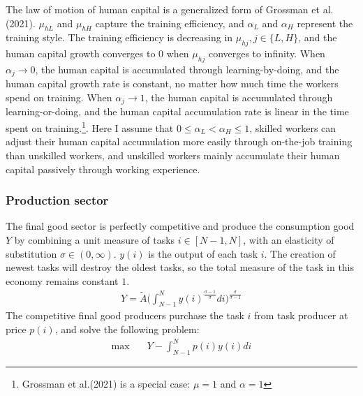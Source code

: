 \documentclass[12pt]{article}
\begin{document}
The law of motion of human capital is a generalized form of Grossman et al.(2021)\cite{Grossmanetal2021}. $\mu_{hL}$ and $\mu_{hH}$ capture the training efficiency, and $\alpha_L$ and $\alpha_H$ represent the training style. The training efficiency is decreasing in $\mu_{hj}, j\in\{L,H\}$, and the human capital growth converges to 0 when $\mu_{hj}$ converges to infinity. When $\alpha_j \to 0$, the human capital is accumulated through learning-by-doing, and the human capital growth rate is constant, no matter how much time the workers spend on training. When $\alpha_j \to 1$, the human capital is accumulated through learning-or-doing, and the human capital accumulation rate is linear in the time spent on training.\footnote{Grossman et al.(2021) is a special case: $\mu = 1$ and $\alpha=1$}. Here I assume that $0\leq\alpha_L<\alpha_H\leq1$, skilled workers can adjust their human capital accumulation more easily through on-the-job training than unskilled workers, and unskilled workers mainly accumulate their human capital passively through working experience. 

\subsubsection*{Production sector}

The final good sector is perfectly competitive and produce the consumption good $Y$ by combining a unit measure of tasks $i\in [N-1,N]$, with an elasticity of substitution $\sigma \in (0,\infty)$. $y(i)$ is the output of each task $i$. The creation of newest tasks will destroy the oldest tasks, so the total measure of the task in this economy remains constant $1$. 
\begin{align*}
Y = \tilde{A}\Big(\int_{N-1}^{N}y(i)^{\frac{\sigma-1}{\sigma}}di\Big)^{\frac{\sigma}{\sigma-1}}
\end{align*}
The competitive final good producers purchase the task $i$ from task producer at price $p(i)$, and solve the following problem:
\begin{align*}
\max \quad & Y-\int_{N-1}^Np(i)y(i)di 
\end{align*}
\end{document}
